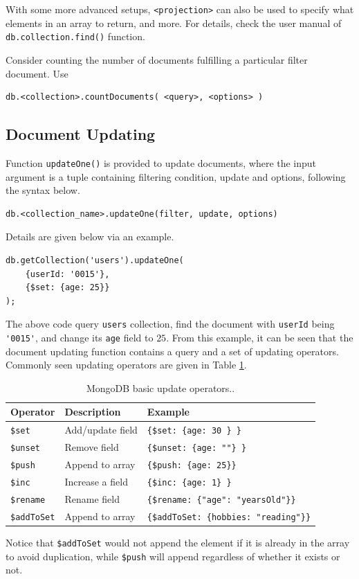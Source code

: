 With some more advanced setups, \verb|<projection>| can also be used to specify what elements in an array to return, and more. For details, check the user manual of \verb|db.collection.find()| function.

Consider counting the number of documents fulfilling a particular filter document. Use
\begin{lstlisting}
db.<collection>.countDocuments( <query>, <options> )
\end{lstlisting}

\subsection{Document Updating}

Function \verb|updateOne()| is provided to update documents, where the input argument is a tuple containing filtering condition, update and options, following the syntax below.
\begin{lstlisting}
db.<collection_name>.updateOne(filter, update, options)
\end{lstlisting}
Details are given below via an example.
\begin{lstlisting}
db.getCollection('users').updateOne(
	{userId: '0015'},
	{$set: {age: 25}}
);
\end{lstlisting}
The above code query \verb|users| collection, find the document with \verb|userId| being \verb|'0015'|, and change its \verb|age| field to $25$. From this example, it can be seen that the document updating function contains a query and a set of updating operators. Commonly seen updating operators are given in Table \ref{ch:db:tab:mongodbupdateoperator}.

\begin{table}
	\centering \caption{MongoDB basic update operators..}\label{ch:db:tab:mongodbupdateoperator}
	\begin{tabularx}{\textwidth}{llX}
		\hline
		Operator & Description & Example \\ \hline
		\verb|$set| & Add/update field & \verb|{$set: {age: 30 } }| \\ 
		\verb|$unset| & Remove field & \verb|{$unset: {age: ""} }| \\ 
		\verb|$push| & Append to array & \verb|{$push: {age: 25}}| \\ 
		\verb|$inc| & Increase a field & \verb|{$inc: {age: 1} }| \\ 
		\verb|$rename| & Rename field &  \verb|{$rename: {"age": "yearsOld"}}| \\ 
		\verb|$addToSet| & Append to array & \verb|{$addToSet: {hobbies: "reading"}}| \\
		\hline
	\end{tabularx}
	\begin{flushleft}
		\footnotesize
		Notice that \verb|$addToSet| would not append the element if it is already in the array to avoid duplication, while \verb|$push| will append regardless of whether it exists or not.  
	\end{flushleft}
\end{table}

